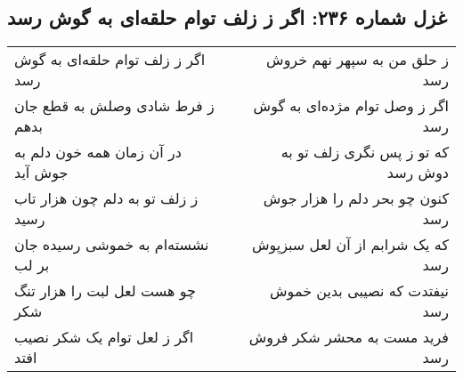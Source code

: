 \begin{center}
\section*{غزل شماره ۲۳۶: اگر ز زلف توام حلقه‌ای به گوش رسد}
\label{sec:236}
\begin{longtable}{l p{0.5cm} r}
اگر ز زلف توام حلقه‌ای به گوش رسد
&&
ز حلق من به سپهر نهم خروش رسد
\\
ز فرط شادی وصلش به قطع جان بدهم
&&
اگر ز وصل توام مژده‌ای به گوش رسد
\\
در آن زمان همه خون دلم به جوش آید
&&
که تو ز پس نگری زلف تو به دوش رسد
\\
ز زلف تو به دلم چون هزار تاب رسید
&&
کنون چو بحر دلم را هزار جوش رسد
\\
نشسته‌ام به خموشی رسیده جان بر لب
&&
که یک شرابم از آن لعل سبزپوش رسد
\\
چو هست لعل لبت را هزار تنگ شکر
&&
نیفتدت که نصیبی بدین خموش رسد
\\
اگر ز لعل توام یک شکر نصیب افتد
&&
فرید مست به محشر شکر فروش رسد
\\
\end{longtable}
\end{center}
